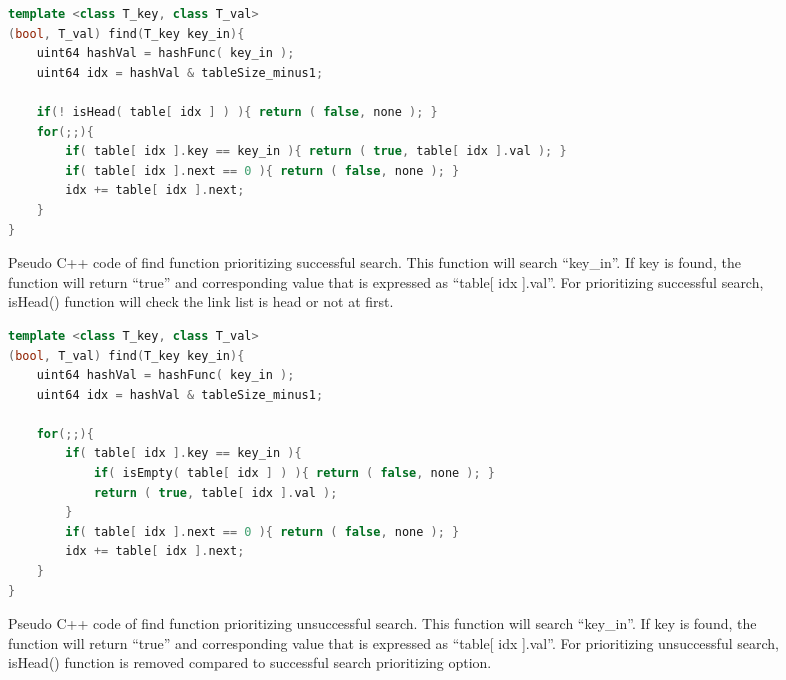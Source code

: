 \begin{figure}%
\begin{lstlisting}[language=C++]
template <class T_key, class T_val>
(bool, T_val) find(T_key key_in){
	uint64 hashVal = hashFunc( key_in );
	uint64 idx = hashVal & tableSize_minus1;
	
	if(! isHead( table[ idx ] ) ){ return ( false, none ); }
	for(;;){
		if( table[ idx ].key == key_in ){ return ( true, table[ idx ].val ); }
		if( table[ idx ].next == 0 ){ return ( false, none ); }
		idx += table[ idx ].next;
	}
}
\end{lstlisting}
\caption{
  Pseudo C++ code of find function prioritizing successful search.
  This function will search ``key\_in''.
  If key is found, the function will return ``true'' and corresponding value that is expressed as ``table[ idx ].val''.
  For prioritizing successful search, isHead() function will check the link list is head or not at first.
}
\label{alg_find_sm}
\begin{lstlisting}[language=C++]
template <class T_key, class T_val>
(bool, T_val) find(T_key key_in){
	uint64 hashVal = hashFunc( key_in );
	uint64 idx = hashVal & tableSize_minus1;
	
	for(;;){
		if( table[ idx ].key == key_in ){
			if( isEmpty( table[ idx ] ) ){ return ( false, none ); }
			return ( true, table[ idx ].val );
		}
		if( table[ idx ].next == 0 ){ return ( false, none ); }
		idx += table[ idx ].next;
	}
}
\end{lstlisting}
\caption{
  Pseudo C++ code of find function prioritizing unsuccessful search.
  This function will search ``key\_in''.
  If key is found, the function will return ``true'' and corresponding value that is expressed as ``table[ idx ].val''.
  For prioritizing unsuccessful search, isHead() function is removed compared to successful search prioritizing option.
}
\label{alg_find_usm}
\end{figure}


